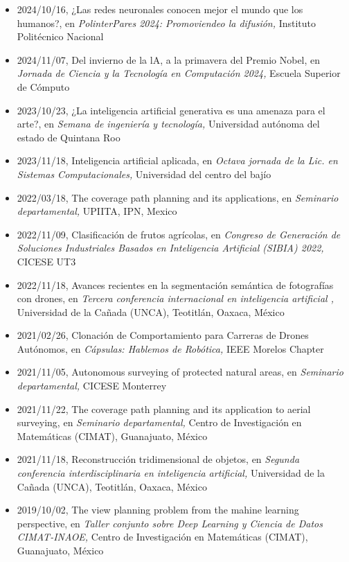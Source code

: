 \begin{itemize} 
\item 2024/10/16, ¿Las redes neuronales conocen mejor el mundo que los humanos?, en \textit{ PolinterPares 2024: Promoviendeo la difusión,} Instituto Politécnico Nacional 
\item 2024/11/07, Del invierno de la lA, a la primavera del Premio Nobel, en \textit{ Jornada de Ciencia y la Tecnología en Computación 2024,} Escuela Superior de Cómputo 
\item 2023/10/23, ¿La inteligencia artificial generativa es una amenaza para el arte?, en \textit{ Semana de ingeniería y tecnología,} Universidad autónoma del estado de Quintana Roo 
\item 2023/11/18, Inteligencia artificial aplicada, en \textit{ Octava jornada de la Lic. en Sistemas Computacionales,} Universidad del centro del bajío 
\item 2022/03/18, The coverage path planning and its applications, en \textit{ Seminario departamental,} UPIITA, IPN, Mexico 
\item 2022/11/09, Clasificación de frutos agrícolas, en \textit{ Congreso de Generación de Soluciones Industriales Basados en Inteligencia Artificial (SIBIA) 2022,} CICESE UT3 
\item 2022/11/18, Avances recientes en la segmentación semántica de fotografías con drones, en \textit{ Tercera conferencia internacional en inteligencia artificial ,} Universidad de la Cañada (UNCA), Teotitlán, Oaxaca, México 
\item 2021/02/26, Clonación de Comportamiento para Carreras de Drones Autónomos, en \textit{ Cápsulas: Hablemos de Robótica,} IEEE Morelos Chapter 
\item 2021/11/05, Autonomous surveying of protected natural areas, en \textit{ Seminario departamental,} CICESE Monterrey 
\item 2021/11/22, The coverage path planning and its application to aerial surveying, en \textit{ Seminario departamental,} Centro de Investigación en Matemáticas (CIMAT), Guanajuato, México 
\item 2021/11/18, Reconstrucción tridimensional de objetos, en \textit{ Segunda conferencia interdisciplinaria en inteligencia artificial,} Universidad de la Cañada (UNCA), Teotitlán, Oaxaca, México 
\item 2019/10/02, The view planning problem from the mahine learning perspective, en \textit{ Taller conjunto sobre Deep Learning y Ciencia de Datos CIMAT-INAOE,} Centro de Investigación en Matemáticas (CIMAT), Guanajuato, México 

\end{itemize}
